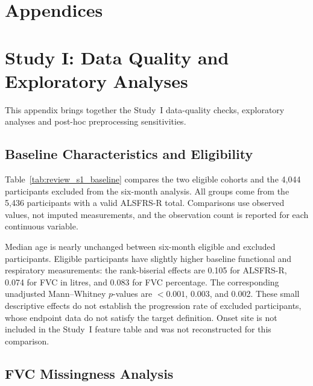 
\appendix
\chapter*{Appendices}
{}

\chapter{Study I: Data Quality and Exploratory Analyses}
\label{app:study1_data}

This appendix brings together the Study~I data-quality checks, exploratory analyses and post-hoc preprocessing sensitivities.

\section{Baseline Characteristics and Eligibility}
\label{app:review_s1_baseline}

Table~\ref{tab:review_s1_baseline} compares the two eligible cohorts and the 4,044 participants excluded from the six-month analysis. All groups come from the 5,436 participants with a valid ALSFRS-R total. Comparisons use observed values, not imputed measurements, and the observation count is reported for each continuous variable.



Median age is nearly unchanged between six-month eligible and excluded participants. Eligible participants have slightly higher baseline functional and respiratory measurements: the rank-biserial effects are 0.105 for ALSFRS-R, 0.074 for FVC in litres, and 0.083 for FVC percentage. The corresponding unadjusted Mann--Whitney $p$-values are $<0.001$, 0.003, and 0.002. These small descriptive effects do not establish the progression rate of excluded participants, whose endpoint data do not satisfy the target definition. Onset site is not included in the Study~I feature table and was not reconstructed for this comparison.

\section{FVC Missingness Analysis}
\label{app:fvc_missingness}

